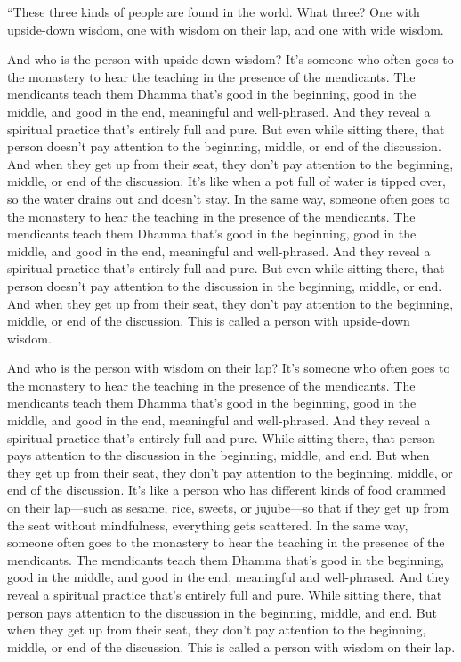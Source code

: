 \documentclass[12pt,openany]{book}%
\begin{document}
“These three kinds of people are found in the world. What three? One with upside-down wisdom, one with wisdom on their lap, and one with wide wisdom. 

And who is the person with upside-down wisdom? It’s someone who often goes to the monastery to hear the teaching in the presence of the mendicants. The mendicants teach them Dhamma that’s good in the beginning, good in the middle, and good in the end, meaningful and well-phrased. And they reveal a spiritual practice that’s entirely full and pure. But even while sitting there, that person doesn’t pay attention to the beginning, middle, or end of the discussion. And when they get up from their seat, they don’t pay attention to the beginning, middle, or end of the discussion. It’s like when a pot full of water is tipped over, so the water drains out and doesn’t stay. In the same way, someone often goes to the monastery to hear the teaching in the presence of the mendicants. The mendicants teach them Dhamma that’s good in the beginning, good in the middle, and good in the end, meaningful and well-phrased. And they reveal a spiritual practice that’s entirely full and pure. But even while sitting there, that person doesn’t pay attention to the discussion in the beginning, middle, or end. And when they get up from their seat, they don’t pay attention to the beginning, middle, or end of the discussion. This is called a person with upside-down wisdom. 

And who is the person with wisdom on their lap? It’s someone who often goes to the monastery to hear the teaching in the presence of the mendicants. The mendicants teach them Dhamma that’s good in the beginning, good in the middle, and good in the end, meaningful and well-phrased. And they reveal a spiritual practice that’s entirely full and pure. While sitting there, that person pays attention to the discussion in the beginning, middle, and end. But when they get up from their seat, they don’t pay attention to the beginning, middle, or end of the discussion. It’s like a person who has different kinds of food crammed on their lap—such as sesame, rice, sweets, or jujube—so that if they get up from the seat without mindfulness, everything gets scattered. In the same way, someone often goes to the monastery to hear the teaching in the presence of the mendicants. The mendicants teach them Dhamma that’s good in the beginning, good in the middle, and good in the end, meaningful and well-phrased. And they reveal a spiritual practice that’s entirely full and pure. While sitting there, that person pays attention to the discussion in the beginning, middle, and end. But when they get up from their seat, they don’t pay attention to the beginning, middle, or end of the discussion. This is called a person with wisdom on their lap. 
\end{document}
